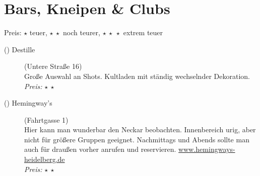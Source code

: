 
\newcommand{\place}[4]{\item[(\stepcounter{zahl}\thezahl) #1](#2)\\ #3\\\emph{Preis:} #4}

\section{Bars, Kneipen \& Clubs}
Preis: $\star$ teuer, $\star\ \star$ noch teurer, $\star\ \star\ \star$ extrem teuer


\begin{description}




    \place{Destille}{Untere Straße 16}{Große Auswahl an Shots. Kultladen mit ständig wechselnder Dekoration.}{$\star\ \star$}




    \place{Hemingway's}{Fahrtgasse 1}{Hier kann man wunderbar den Neckar beobachten. Innenbereich urig, aber nicht für größere Gruppen geeignet. Nachmittags und Abends sollte man auch für draußen vorher anrufen und reservieren. \url{www.hemingways-heidelberg.de}}{$\star\ \star$}


\end{description}
